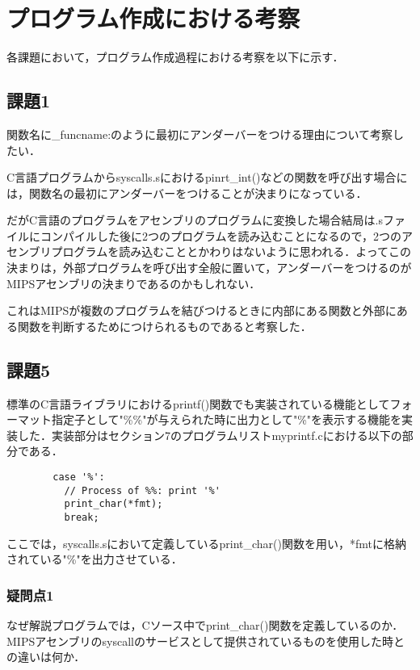 \documentclass[a4j]{jarticle}
\begin{document}
%
%

\section{プログラム作成における考察}

各課題において，プログラム作成過程における考察を以下に示す．

\subsection{課題1}

関数名に\_funcname:のように最初にアンダーバーをつける理由について考察したい．

C言語プログラムからsyscalls.sにおけるpinrt\_int()などの関数を呼び出す場合には，関数名の最初にアンダーバーをつけることが決まりになっている．

だがC言語のプログラムをアセンブリのプログラムに変換した場合結局は.sファイルにコンパイルした後に2つのプログラムを読み込むことになるので，2つのアセンブリプログラムを読み込むこととかわりはないように思われる．よってこの決まりは，外部プログラムを呼び出す全般に置いて，アンダーバーをつけるのがMIPSアセンブリの決まりであるのかもしれない．

これはMIPSが複数のプログラムを結びつけるときに内部にある関数と外部にある関数を判断するためにつけられるものであると考察した．


\subsection{課題5}

標準のC言語ライブラリにおけるprintf()関数でも実装されている機能としてフォーマット指定子として"\%\%"が与えられた時に出力として"\%"を表示する機能を実装した．実装部分はセクション7のプログラムリストmyprintf.cにおける以下の部分である．

\begin{verbatim}
        case '%':
          // Process of %%: print '%'
          print_char(*fmt);
          break;
\end{verbatim}

ここでは，syscalls.sにおいて定義しているprint\_char()関数を用い，*fmtに格納されている"\%"を出力させている．

\subsubsection{疑問点1}

なぜ解説プログラムでは，Cソース中でprint\_char()関数を定義しているのか．MIPSアセンブリのsyscallのサービスとして提供されているものを使用した時との違いは何か．
\end{document}
